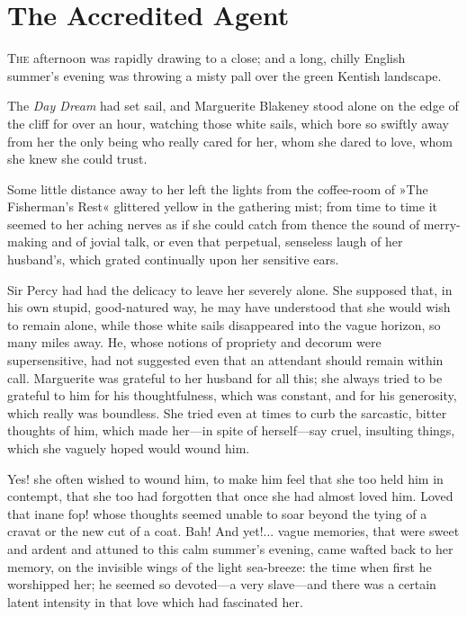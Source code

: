 
\chapter{The Accredited Agent}
\lettrine[lines=4]{T}{he} afternoon was rapidly drawing to a close; and a long, chilly English summer's evening was throwing a misty pall over the green Kentish landscape.

\zz
The \textit{Day Dream} had set sail, and Marguerite Blakeney stood alone on the edge of the cliff for over an hour, watching those white sails, which bore so swiftly away from her the only being who really cared for her, whom she dared to love, whom she knew she could trust.

Some little distance away to her left the lights from the coffee-room of »The Fisherman's Rest« glittered yellow in the gathering mist; from time to time it seemed to her aching nerves as if she could catch from thence the sound of merry-making and of jovial talk, or even that perpetual, senseless laugh of her husband's, which grated continually upon her sensitive ears.

Sir Percy had had the delicacy to leave her severely alone. She supposed that, in his own stupid, good-natured way, he may have understood that she would wish to remain alone, while those white sails disappeared into the vague horizon, so many miles away. He, whose notions of propriety and decorum were supersensitive, had not suggested even that an attendant should remain within call. Marguerite was grateful to her husband for all this; she always tried to be grateful to him for his thoughtfulness, which was constant, and for his generosity, which really was boundless. She tried even at times to curb the sarcastic, bitter thoughts of him, which made her\allowbreak---\allowbreak in spite of herself\allowbreak---\allowbreak say cruel, insulting things, which she vaguely hoped would wound him.

Yes! she often wished to wound him, to make him feel that she too held him in contempt, that she too had forgotten that once she had almost loved him. Loved that inane fop! whose thoughts seemed unable to soar beyond the tying of a cravat or the new cut of a coat. Bah! And yet!... vague memories, that were sweet and ardent and attuned to this calm summer's evening, came wafted back to her memory, on the invisible wings of the light sea-breeze: the time when first he worshipped her; he seemed so devoted\allowbreak---\allowbreak a very slave\allowbreak---\allowbreak and there was a certain latent intensity in that love which had fascinated her.

